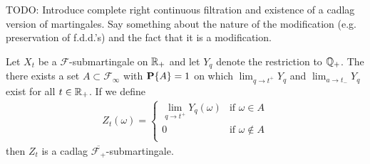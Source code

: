 TODO: Introduce complete right continuous filtration and existence of
a cadlag version of martingales.  Say something about the nature of
the modification (e.g. preservation of f.d.d.'s) and the fact that it
is a modification.

\begin{thm}Let $X_t$  be a $\mathcal{F}$-submartingale on $\mathbb{R}_+$
  and let $Y_q$ denote the restriction to $\mathbb{Q}_+$.  The there
  exists a set $A \subset \mathcal{F}_\infty$ with $\textbf{P}\{A\}=1$ on which
  $\lim_{q \to t^+} Y_q$ and $\lim_{a \to t_-} Y_q$ exist for all $t
  \in \mathbb{R}_+$.  If we
  define 
\begin{align*}
Z_t(\omega) = 
\begin{cases}
\lim_{q \to t^+} Y_q(\omega) & \text{if $\omega \in A$} \\
0 & \text{if $\omega \notin A$} \\
\end{cases}
\end{align*} 
then $Z_t$ is a cadlag
  $\overline{\mathcal{F}_+}$-submartingale.
\end{thm}
